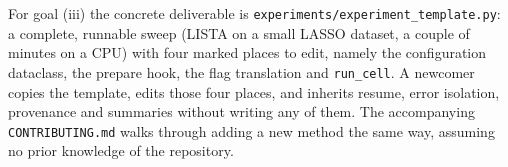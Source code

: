 For goal (iii) the concrete deliverable is
\texttt{experiments/experiment\_template.py}: a complete, runnable sweep
(LISTA on a small LASSO dataset, a couple of minutes on a CPU) with four
marked places to edit, namely the configuration dataclass, the prepare hook,
the flag translation and \texttt{run\_cell}. A newcomer copies the template,
edits those four places, and inherits resume, error isolation, provenance
and summaries without writing any of them. The accompanying
\texttt{CONTRIBUTING.md} walks through adding a new method the same way,
assuming no prior knowledge of the repository.
